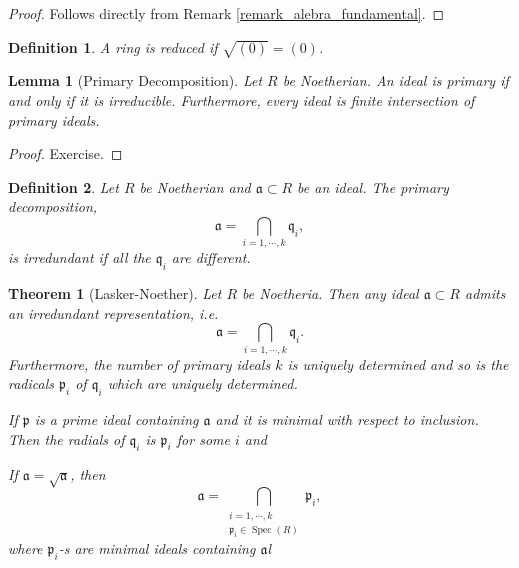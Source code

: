 \documentclass{article}
\newtheorem{theorem}{Theorem} [section]
\newtheorem{definition}{Definition}[section]
\newtheorem{lemma}{Lemma}[section]
\DeclareMathOperator{\Spec}{Spec}
\begin{document}
\begin{proof}
  Follows directly from Remark \ref{remark_alebra_fundamental}.
\end{proof}

\begin{definition}
  A ring is reduced if $\sqrt{(0)} = (0)$.
\end{definition}

\begin{lemma}[Primary Decomposition]
Let $R$ be Noetherian. An ideal is primary if and only if it is irreducible. Furthermore, every ideal is finite intersection of primary ideals.
\end{lemma}

\begin{proof}
  Exercise.
\end{proof}

\begin{definition}
  Let $R$ be Noetherian and $\mathfrak{a}\subset R$ be an ideal. The primary decomposition,
  \begin{equation*}
    \mathfrak{a} = \bigcap_{i=1,\cdots, k}\mathfrak{q}_i,
  \end{equation*}
  is irredundant if all the $\mathfrak{q}_i$ are different.
\end{definition}

\begin{theorem}[Lasker-Noether]
  \label{theorem_5_2}
  Let $R$ be Noetheria. Then any ideal $\mathfrak{a}\subset R$ admits an irredundant representation, i.e.
  \begin{equation*}
    \mathfrak{a} = \bigcap_{i=1,\cdots,k}\mathfrak{q}_i.
  \end{equation*}
  Furthermore, the number of primary ideals $k$ is uniquely determined and so is the radicals $\mathfrak{p}_i$ of $\mathfrak{q}_i$ which are uniquely determined.
  \par If $\mathfrak{p}$ is a prime ideal containing $\mathfrak{a}$ and it is minimal with respect to inclusion. Then the radials of $\mathfrak{q}_i$ is $\mathfrak{p}_i$ for some $i$ and %
  \par If $\mathfrak{a} = \sqrt{\mathfrak{a}}$, then 
  \begin{equation*}
    \mathfrak{a} = \bigcap_{\substack{i=1,\cdots,k\\\mathfrak{p}_i\in\Spec(R)}}\mathfrak{p}_i,
  \end{equation*}
  where $\mathfrak{p}_i$-s are minimal ideals containing $\mathfrak{a}$l
\end{theorem}
\end{document}
